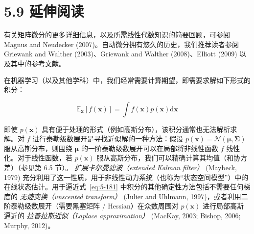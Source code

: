 \section*{5.9 延伸阅读}
\label{sec:5.9}

有关矩阵微分的更多详细信息，以及所需线性代数知识的简要回顾，可参阅 Magnus and Neudecker (2007)。自动微分拥有悠久的历史，我们推荐读者参阅 Griewank and Walther (2003)、Griewank and Walther (2008)、Elliott (2009) 以及其中的参考文献。

在机器学习（以及其他学科）中，我们经常需要计算期望，即需要求解如下形式的积分：

\begin{equation}
\mathbb{E}_{\boldsymbol{x}}[f(\boldsymbol{x})] = \int f(\boldsymbol{x}) p(\boldsymbol{x}) \mathrm{d}\boldsymbol{x}
\tag{5.181}\label{eq:5-181}
\end{equation}

即使 $ p(\boldsymbol{x}) $ 具有便于处理的形式（例如高斯分布），该积分通常也无法解析求解。对 $ f $ 进行泰勒级数展开是寻找近似解的一种方法：假设 $ p(\boldsymbol{x}) = \mathcal{N}(\boldsymbol{\mu}, \boldsymbol{\Sigma}) $ 服从高斯分布，则围绕 $ \boldsymbol{\mu} $ 的一阶泰勒级数展开可以在局部将非线性函数 $ f $ 线性化。对于线性函数，若 $ p(\boldsymbol{x}) $ 服从高斯分布，我们可以精确计算其均值（和协方差）（参见第 6.5 节）。 \emph{扩展卡尔曼滤波（extended Kalman filter）} (Maybeck, 1979) 充分利用了这一性质，用于非线性动力系统（也称为“状态空间模型”）中的在线状态估计。用于逼近式~\eqref{eq:5-181} 中积分的其他确定性方法包括不需要任何梯度的 \emph{无迹变换（unscented transform）} (Julier and Uhlmann, 1997)，或者利用二阶泰勒级数展开（需要黑塞矩阵 / Hessian）在众数周围对 $ p(\boldsymbol{x}) $ 进行局部高斯逼近的 \emph{拉普拉斯近似（Laplace approximation）} (MacKay, 2003; Bishop, 2006; Murphy, 2012)。
